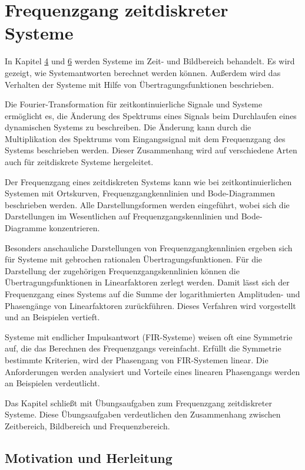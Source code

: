 \chapter{Frequenzgang zeitdiskreter Systeme}\label{sec:frequenzgang-zeitdiskreter-systeme}

In Kapitel \hyperref[zeitdiskrete-systeme-im-zeitbereich]{4} und \hyperref[zeitdiskrete-systeme-im-z-bereich]{6} werden Systeme im Zeit- und Bildbereich behandelt. Es wird gezeigt, wie Systemantworten berechnet werden können. Außerdem wird das Verhalten der Systeme mit Hilfe von Übertragungsfunktionen beschrieben.

Die Fourier-Transformation für zeitkontinuierliche Signale und Systeme ermöglicht es, die Änderung des Spektrums eines Signals beim Durchlaufen eines dynamischen Systems zu beschreiben. Die Änderung kann durch die Multiplikation des Spektrums vom Eingangssignal mit dem Frequenzgang des Systems beschrieben werden. Dieser Zusammenhang wird auf verschiedene Arten auch für zeitdiskrete Systeme hergeleitet.

Der Frequenzgang eines zeitdiskreten Systems kann wie bei zeitkontinuierlichen Systemen mit Ortskurven, Frequenzgangkennlinien und Bode-Diagrammen beschrieben werden. Alle Darstellungsformen werden eingeführt, wobei sich die Darstellungen im Wesentlichen auf Frequenzgangskennlinien und Bode-Diagramme konzentrieren.

Besonders anschauliche Darstellungen von Frequenzgangkennlinien ergeben sich für Systeme mit gebrochen rationalen Übertragungsfunktionen. Für die Darstellung der zugehörigen Frequenzgangskennlinien können die Übertragungsfunktionen in Linearfaktoren zerlegt werden. Damit lässt sich der Frequenzgang eines Systems auf die Summe der logarithmierten Amplituden- und Phasengänge von Linearfaktoren zurückführen. Dieses Verfahren wird vorgestellt und an Beispielen vertieft.

Systeme mit endlicher Impulsantwort (FIR-Systeme) weisen oft eine Symmetrie auf, die das Berechnen des Frequenzgangs vereinfacht. Erfüllt die Symmetrie bestimmte Kriterien, wird der Phasengang von FIR-Systemen linear. Die Anforderungen werden analysiert und Vorteile eines linearen Phasengangs werden an Beispielen verdeutlicht.

Das Kapitel schließt mit Übungsaufgaben zum Frequenzgang zeitdiskreter Systeme. Diese Übungsaufgaben verdeutlichen den Zusammenhang zwischen Zeitbereich, Bildbereich und Frequenzbereich.

\section{Motivation und Herleitung}\label{sec:8.1}

